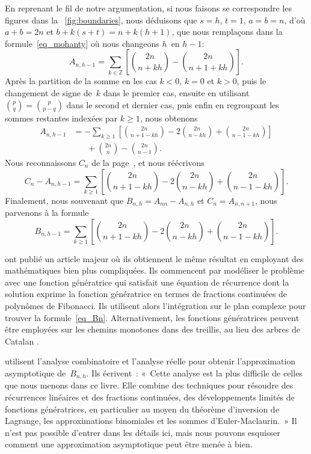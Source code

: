 En reprenant le fil de notre argumentation, si nous faisons se
correspondre les figures dans la \fig~\ref{fig:boundaries}, nous
déduisons que \(s=h\), \(t=1\), \(a=b=n\), d'où \(a+b=2n\) et
\(b+k(s+t)=n+k(h+1)\), que nous remplaçons dans la
formule~\eqref{eq_mohanty} où nous changeons \(h\)~en \(h-1\):
\begin{equation*}
A_{n,h-1} = \sum_{k \in \mathbb{Z}}\left[\binom{2n}{n+kh} -
           \binom{2n}{n+1+kh}\right].
\end{equation*}
Après la partition de la somme en les cas \(k<0\), \(k=0\) et \(k>0\),
puis le changement de signe de~\(k\) dans le premier cas, ensuite en
utilisant \(\binom{p}{q} = \binom{p}{p-q}\) dans le second et dernier
cas, puis enfin en regroupant les sommes restantes indexées par \(k
\geqslant 1\), nous obtenons
\begin{align*}
A_{n,h-1}
  &= - \sum_{k \geqslant 1}\left[\binom{2n}{n+1-kh} -
    2\binom{2n}{n-kh} + \binom{2n}{n-1-kh}\right]\\
  &\phantom{=}\; + \binom{2n}{n} - \binom{2n}{n-1}.
\end{align*}
Nous reconnaissons \(C_n\) de la page~\pageref{eq_Ann}, et nous
réécrivons
\begin{equation*}
C_n - A_{n,h-1}
  = \sum_{k \geqslant 1}\left[\binom{2n}{n+1-kh} -
    2\binom{2n}{n-kh} + \binom{2n}{n-1-kh}\right].
\end{equation*}
Finalement, nous souvenant que \(B_{n,h} = A_{nn} - A_{n,h}\) et \(C_n =
A_{n,n+1}\), nous parvenons à la formule
\begin{equation}
B_{n,h-1} = \sum_{k \geqslant 1}
            \left[\binom{2n}{n+1-kh} - 2\binom{2n}{n-kh}
            + \binom{2n}{n-1-kh}\right].
\label{eq_Bn}
\end{equation}

\citet*{KnuthdeBruijnRice_1972} ont publié un article majeur où ils
obtiennent le même résultat en employant des mathématiques bien plus
compliquées. Ils commencent par modéliser le problème avec une
fonction génératrice \citep{Wilf_1990} qui satisfait une équation de
récurrence dont la solution exprime la fonction génératrice en termes
de fractions continuées de polynômes de Fibonacci. Ils utilisent alors
l'intégration sur le plan complexe pour trouver la
formule~\eqref{eq_Bn}. Alternativement, les fonctions génératrices
peuvent être employées sur les chemins monotones dans des treillis, au
lieu des arbres de Catalan \citep[page~64]{Kemp_1984}
\citep{FlajoletNebelProdinger_2006}.

\citet*{SedgewickFlajolet_1996} \citep{FlajoletSedgewick_2009} utilisent l'analyse combinatoire et l'analyse réelle pour obtenir l'approximation asymptotique de~\(B_{n,h}\). Ils écrivent~\cite[p.~260]{SedgewickFlajolet_1996}: «~Cette analyse est la plus difficile de celles que nous menons dans ce livre. Elle combine des techniques pour résoudre des récurrences linéaires et des fractions continuées, des développements limités de fonctions génératrices, en particulier au moyen du théorème d'inversion de Lagrange, les approximations binomiales et les sommes d'Euler\--Maclaurin.~» Il n'est pas possible d'entrer dans les détails ici, mais nous pouvons esquisser comment une approximation asymptotique peut être menée à bien.

